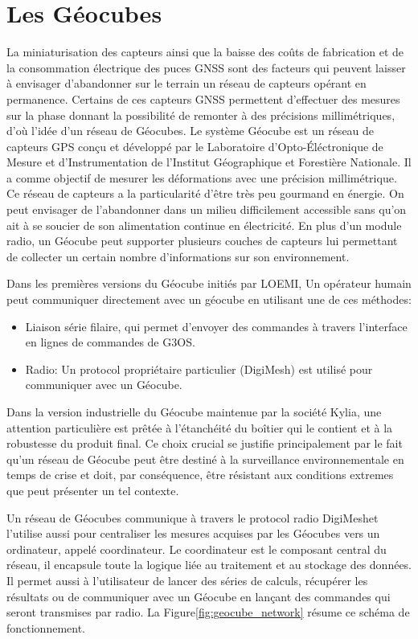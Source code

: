 \documentclass{themeensg}
\begin{document}
\section{Les Géocubes}
La miniaturisation des capteurs ainsi que la baisse des coûts de fabrication et de la consommation électrique des puces GNSS sont des facteurs qui peuvent laisser à envisager d'abandonner sur le terrain un réseau de capteurs opérant en permanence. Certains de ces capteurs GNSS permettent d'effectuer des mesures sur la phase donnant la possibilité de remonter à des précisions millimétriques, d'où l'idée d'un réseau de Géocubes. Le système Géocube est un réseau de capteurs GPS conçu et développé par le Laboratoire d'Opto-Éléctronique de Mesure et d'Instrumentation de l'Institut Géographique et Forestière Nationale. Il a comme objectif de mesurer les déformations avec une précision millimétrique. Ce réseau de capteurs a la particularité d'être très peu gourmand en énergie. On peut envisager de l'abandonner dans un milieu difficilement accessible sans qu'on ait à se soucier de son alimentation continue en électricité. En plus d'un module radio, un Géocube peut supporter plusieurs couches de capteurs lui permettant de collecter un certain nombre d'informations sur son environnement.

Dans les premières versions du Géocube initiés par LOEMI, Un opérateur humain peut communiquer directement avec un géocube en utilisant une de ces méthodes:

\begin{itemize}
\item Liaison série filaire, qui permet d'envoyer des commandes  à travers l'interface en lignes de commandes de G3OS.
\item Radio: Un protocol propriétaire particulier (DigiMesh\textcopyright) est utilisé pour communiquer avec un Géocube.
\end{itemize}

Dans la version industrielle du Géocube maintenue par la société Kylia, une attention particulière est prêtée à l'étanchéité du boîtier qui le contient et à la robustesse du produit final. Ce choix crucial se justifie principalement par le fait qu'un réseau de Géocube peut être destiné à la surveillance environnementale en temps de crise et doit, par conséquence, être résistant aux conditions extremes que peut présenter un tel contexte.

Un réseau de Géocubes communique à travers le protocol radio DigiMesh\textcopyright et l'utilise aussi pour centraliser les mesures acquises par les Géocubes vers un ordinateur, appelé coordinateur. Le coordinateur est le composant central du réseau, il encapsule toute la logique liée au traitement et au stockage des données. Il permet aussi à l'utilisateur de lancer des séries de calculs, récupérer les résultats ou de communiquer avec un Géocube en lançant des commandes qui seront transmises par radio. La Figure\ref{fig:geocube_network} résume ce schéma de fonctionnement.
\end{document}
